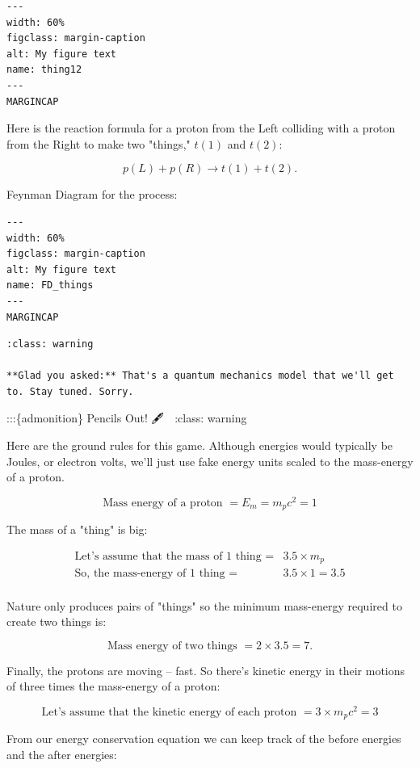 \documentclass[
]{article}
\begin{document}
\begin{verbatim}
---
width: 60%
figclass: margin-caption
alt: My figure text
name: thing12
---
MARGINCAP
\end{verbatim}

Here is the reaction formula for a proton from the Left colliding with a
proton from the Right to make two "things," \(t(1)\) and \(t(2)\):

\[p(L) + p(R) \to t(1) + t(2). \nonumber\]

Feynman Diagram for the process:

\begin{verbatim}
---
width: 60%
figclass: margin-caption
alt: My figure text
name: FD_things
---
MARGINCAP
\end{verbatim}

\begin{verbatim}
:class: warning

**Glad you asked:** That's a quantum mechanics model that we'll get to. Stay tuned. Sorry.
\end{verbatim}

:::\{admonition\} Pencils Out! 🖋 📓 :class: warning

Here are the ground rules for this game. Although energies would
typically be Joules, or electron volts, we'll just use fake energy units
scaled to the mass-energy of a proton.

\[\text{Mass energy of a proton } = E_m = m_pc^2 = 1 \nonumber\]

The mass of a "thing" is big:

\begin{align*}
\text{Let's assume that the mass of 1 thing } =& 3.5\times m_p \\
\text{So, the mass-energy of 1 thing } =& 3.5 \times 1 = 3.5\\
\end{align*}

Nature only produces pairs of "things" so the minimum mass-energy
required to create two things is:

\[\text{Mass energy of two things } = 2 \times 3.5 = 7. \nonumber\]

Finally, the protons are moving -- fast. So there's kinetic energy in
their motions of three times the mass-energy of a proton:

\[\text{Let's assume that the kinetic energy of each proton } = 3 \times m_pc^2 = 3 \nonumber\]

From our energy conservation equation we can keep track of the before
energies and the after energies:
\end{document}
